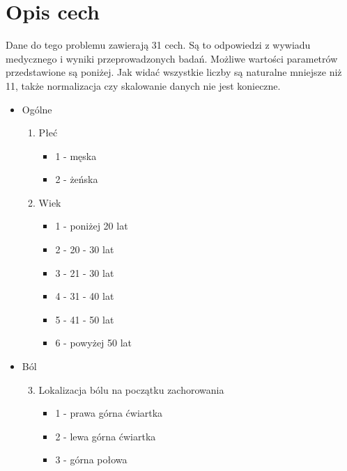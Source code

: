 \documentclass{report}
\begin{document}
    \section{Opis cech}

    Dane do tego problemu zawierają 31 cech.
    Są to odpowiedzi z wywiadu medycznego i wyniki przeprowadzonych badań.
    Możliwe wartości parametrów przedstawione są poniżej.
    Jak widać wszystkie liczby są naturalne mniejsze niż 11, także normalizacja czy skalowanie danych nie jest konieczne.

    \begin{itemize}
        \item Ogólne
        \begin{enumerate}
            \setcounter{enumi}{0}
            \item Płeć
            \begin{itemize}
                \item 1 - męska
                \item 2 - żeńska
            \end{itemize}
        \end{enumerate}
        \begin{enumerate}
            \setcounter{enumi}{1}
            \item Wiek
            \begin{itemize}
                \item 1 - poniżej 20 lat
                \item 2 - 20 - 30 lat
                \item 3 - 21 - 30 lat
                \item 4 - 31 - 40 lat
                \item 5 - 41 - 50 lat
                \item 6 - powyżej 50 lat
            \end{itemize}
        \end{enumerate}
        \item Ból
        \begin{enumerate}
            \setcounter{enumi}{2}
            \item Lokalizacja bólu na początku zachorowania
            \begin{itemize}
                \item 1 - prawa górna ćwiartka
                \item 2 - lewa górna ćwiartka
                \item 3 - górna połowa

\end{itemize}
\end{enumerate}
\end{itemize}
\end{document}
